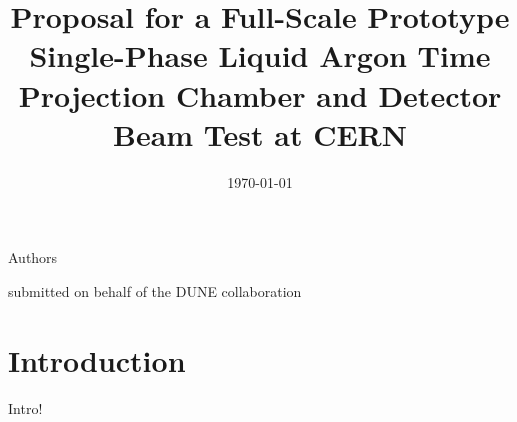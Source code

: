 \documentclass[12pt]{article}
\begin{document}

\title{Proposal for a Full-Scale Prototype Single-Phase Liquid Argon Time Projection Chamber and Detector Beam Test at CERN}

\date{\today}
Authors
%	
%	

\maketitle

\centerline{submitted on behalf of the DUNE collaboration}





\newpage
%	

\newpage
\tableofcontents

\newpage


\section{Introduction}
Intro!
%	
\end{document}
